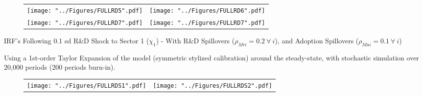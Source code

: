 \documentclass[compress,xcolor=dvipsnames]{beamer}
\begin{document}
\begin{frame}
\begin{figure}[h!]
\centering
\begin{adjustbox}{center}
\begin{tabular}{cc}
\texttt{[image: "../Figures/FULLRD5".pdf]} & %
\texttt{[image: "../Figures/FULLRD6".pdf]}  \\%
\texttt{[image: "../Figures/FULLRD7".pdf]} & \texttt{[image: "../Figures/FULLRD7".pdf]}
\end{tabular}
\end{adjustbox}
\end{figure}
\end{frame}


\begin{frame}
\begin{footnotesize}
IRF's Following 0.1 sd R\&D Shock to Sector 1 ($\chi_1$) - With R\&D Spillovers ($\rho_{Mri} = 0.2\ \forall\ i$), and Adoption Spillovers ($\rho_{Mai} = 0.1\ \forall\ i$)  \\ \vspace{1mm}
{\tiny Using a 1st-order Taylor Expansion of the model (symmetric stylized calibration) around the steady-state, with stochastic simulation over 20,000 periods (200 periods burn-in).\par}
\end{footnotesize} %
\begin{figure}[h!]
\centering
\begin{adjustbox}{center}
\begin{tabular}{cc}
\texttt{[image: "../Figures/FULLRDS1".pdf]} & %
\texttt{[image: "../Figures/FULLRDS2".pdf]}  %
\end{tabular}
\end{adjustbox}
\end{figure}
\end{frame}
\end{document}

